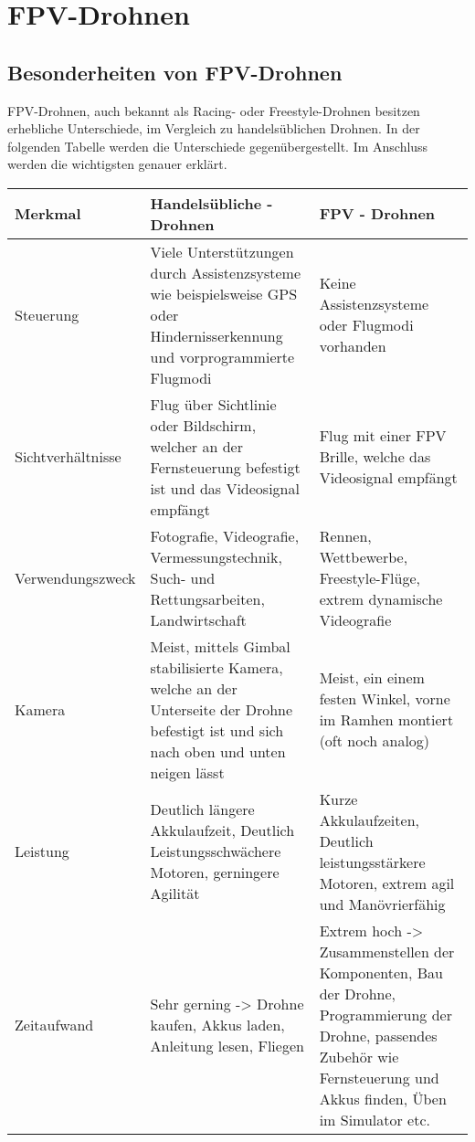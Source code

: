 \section[FPV-Drohnen]{FPV-Drohnen}
\subsection[Besonderheiten von FPV-Drohnen]{Besonderheiten von FPV-Drohnen}

FPV-Drohnen, auch bekannt als Racing- oder Freestyle-Drohnen besitzen erhebliche Unterschiede, im Vergleich zu handelsüblichen Drohnen. In der folgenden Tabelle werden die Unterschiede gegenübergestellt. Im Anschluss werden die wichtigsten genauer erklärt. 

\vspace{1cm}
\renewcommand{\arraystretch}{1.5}
\begin{tabular}{p{3cm}p{5.86cm}p{5.86cm}}
    \toprule
    \textbf{Merkmal} & \textbf{Handelsübliche - Drohnen} & \textbf{FPV - Drohnen} \\
    \midrule
    Steuerung           & Viele Unterstützungen durch Assistenzsysteme wie beispielsweise GPS oder Hindernisserkennung und vorprogrammierte Flugmodi               & Keine Assistenzsysteme oder Flugmodi vorhanden \\
    Sichtverhältnisse   & Flug über Sichtlinie oder Bildschirm, welcher an der Fernsteuerung befestigt ist und das Videosignal empfängt                            & Flug mit einer FPV Brille, welche das Videosignal empfängt \\
    Verwendungszweck    & Fotografie, Videografie, Vermessungstechnik, Such- und Rettungsarbeiten, Landwirtschaft                                                  & Rennen, Wettbewerbe, Freestyle-Flüge, extrem dynamische Videografie \\
    Kamera              & Meist, mittels Gimbal stabilisierte Kamera, welche an der Unterseite der Drohne befestigt ist und sich nach oben und unten neigen lässt  & Meist, ein einem festen Winkel, vorne im Ramhen montiert (oft noch analog) \\
    Leistung            & Deutlich längere Akkulaufzeit, Deutlich Leistungsschwächere Motoren, gerningere Agilität                                                 & Kurze Akkulaufzeiten, Deutlich leistungsstärkere Motoren, extrem agil und Manövrierfähig \\
    Zeitaufwand         & Sehr gerning -> Drohne kaufen, Akkus laden, Anleitung lesen, Fliegen                                                                     & Extrem hoch -> Zusammenstellen der Komponenten, Bau der Drohne, Programmierung der Drohne, passendes Zubehör wie Fernsteuerung und Akkus finden, Üben im Simulator etc. \\
    \bottomrule
\end{tabular}
\vspace{1cm}

